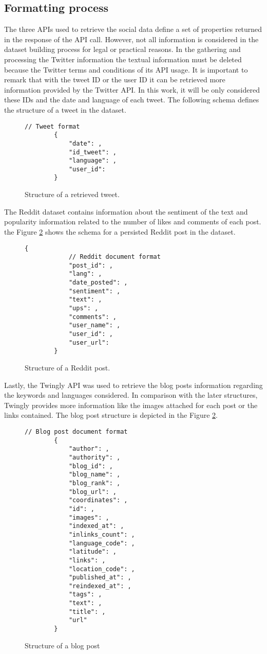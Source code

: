 \subsection{Formatting process}
The three APIs used to retrieve the social data define a set of properties returned in the response of the API call. However, not all information is considered in the dataset building process for legal or practical reasons. In the gathering and processing the Twitter information the textual information must be deleted because the Twitter terms and conditions of its API usage. It is important to remark that with the tweet ID or the user ID it can be retrieved more information provided by the Twitter API. In this work, it will be only considered these IDs and the date and language of each tweet. The following schema defines the structure of a tweet in the dataset.
\begin{figure}[H]
	\begin{Verbatim}[xleftmargin=.5in]
		// Tweet format
		{
			"date": ,
			"id_tweet": ,
			"language": ,
			"user_id": 
		}
	\end{Verbatim}
	\caption{Structure of a retrieved tweet.}
\end{figure}


\par 

The Reddit dataset contains information about the sentiment of the text and popularity information related to the number of likes and comments of each post. the Figure \ref{fig:twinglyStructure} shows the schema for a persisted Reddit post in the dataset.
\begin{figure}[H]
	\begin{Verbatim}[xleftmargin=.5in]
		{
			// Reddit document format
			"post_id": ,
			"lang": ,
			"date_posted": ,
			"sentiment": ,
			"text": ,
			"ups": ,
			"comments": ,
			"user_name": ,
			"user_id": ,
			"user_url": 
		}
	\end{Verbatim}
	\caption{Structure of a Reddit post.}
	\label{fig:redditStructure}
\end{figure}

\par

Lastly, the Twingly API was used to retrieve the blog posts information regarding the keywords and languages considered. In comparison with the later structures, Twingly provides more information like the images attached for each post or the links contained. The blog post structure is depicted in the Figure \ref{fig:twinglyStructure}.
\begin{figure}[H]
	\begin{Verbatim}[xleftmargin=.5in]
		// Blog post document format
		{
			"author": ,
			"authority": ,
			"blog_id": ,
			"blog_name": ,
			"blog_rank": ,
			"blog_url": ,
			"coordinates": ,
			"id": ,
			"images": ,
			"indexed_at": ,
			"inlinks_count": ,
			"language_code": ,
			"latitude": ,
			"links": ,
			"location_code": ,
			"published_at": ,
			"reindexed_at": ,
			"tags": ,
			"text": ,
			"title": ,
			"url"
		}
	\end{Verbatim}
	\caption{Structure of a blog post}
	\label{fig:twinglyStructure}
\end{figure}
